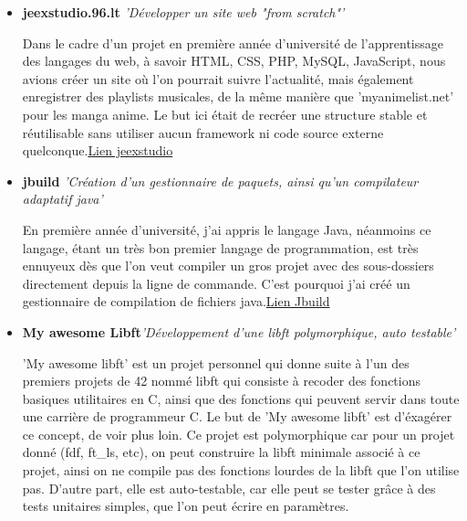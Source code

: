 \documentclass[11pt,a4paper,sans]{moderncv}        %
\begin{document}
\begin{itemize}
	
	\item{\textbf{jeexstudio.96.lt} \textit{'Développer un site web "from scratch"'}
		
		\vspace{3pt}
		
		\small{Dans le cadre d'un projet en première année d'université de l'apprentissage des langages du web, à savoir HTML, CSS, PHP, MySQL, JavaScript, nous avions créer un site où l'on pourrait suivre l'actualité, mais également enregistrer des playlists musicales, de la même manière que 'myanimelist.net' pour les manga anime. Le but ici était de recréer une structure stable et réutilisable sans utiliser aucun framework ni code source externe quelconque.\href{http://jeexstudio.96.lt/Pagepremierevisite/JeexStudio.php}{Lien jeexstudio}}}
	
	\vspace{6pt}
	
	\item{\textbf{jbuild} \textit{'Création d'un gestionnaire de paquets, ainsi qu'un compilateur adaptatif java'}
		
		\vspace{3pt}
		
		\small{En première année d'université, j'ai appris le langage Java, néanmoins ce langage, étant un très bon premier langage de programmation, est très ennuyeux dès que l'on veut compiler un gros projet avec des sous-dossiers directement depuis la ligne de commande. C'est pourquoi j'ai créé un gestionnaire de compilation de fichiers java.\href{https://github.com/FauconFan/jbuild}{Lien Jbuild}}}
	
	\vspace{6pt}
	
	\item{\textbf{My awesome Libft}\textit{'Développement d'une libft polymorphique, auto testable'}
		
		\vspace{3pt}
		
		\small{'My awesome libft' est un projet personnel qui donne suite à l'un des premiers projets de 42 nommé libft qui consiste à recoder des fonctions basiques utilitaires en C, ainsi que des fonctions qui peuvent servir dans toute une carrière de programmeur C. Le but de 'My awesome libft' est d'éxagérer ce concept, de voir plus loin. Ce projet est polymorphique car pour un projet donné (fdf, ft\_ls, etc), on peut construire la libft minimale associé à ce projet, ainsi on ne compile pas des fonctions lourdes de la libft que l'on utilise pas. D'autre part, elle est auto-testable, car elle peut se tester grâce à des tests unitaires simples, que l'on peut écrire en paramètres.}}
	
\end{itemize}
\end{document}
